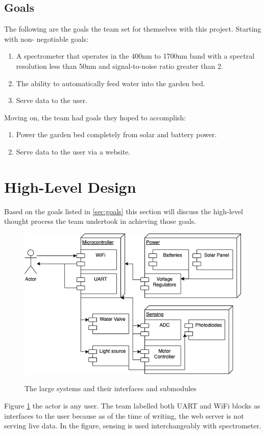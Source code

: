 \documentclass[journal]{IEEEtran}
\begin{document}
\subsection{Goals} \label{sec:goals}
The following are the goals the team set for themselves with this project. Starting with non-
negotiable goals:
\begin{enumerate}
	\item A spectrometer that operates in the 400nm to 1700nm band with a spectral resolution less
	      than 50nm and signal-to-noise ratio greater than 2.
	\item The ability to automatically feed water into the garden bed.
	\item Serve data to the user.
\end{enumerate}
Moving on, the team had goals they hoped to accomplish:
\begin{enumerate}
	\item Power the garden bed completely from solar and battery power.
	\item Serve data to the user via a website.
\end{enumerate}
\section{High-Level Design}
Based on the goals listed in \autoref{sec:goals} this section will discuss the high-level thought
process the team undertook in achieving those goals.
\begin{figure}[H]
	\centering
	\includegraphics[width=\linewidth]{images/Flowchart.png}
	\label{fig:flowchart}
	\caption{The large systems and their interfaces and submodules}
\end{figure}
Figure \ref{fig:flowchart} the actor is any user. The team labelled both UART and WiFi blocks as interfaces to the user
because as of the time of writing, the web server is not serving live data. In the figure, sensing is used interchangeably with spectrometer.
\end{document}
